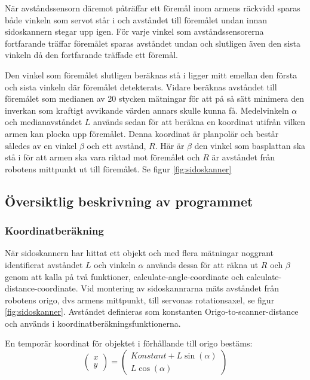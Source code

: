 När avståndssensorn däremot påträffar ett föremål inom armens räckvidd sparas både vinkeln som servot står i och avståndet till föremålet undan innan sidoskannern stegar upp igen. För varje vinkel som avståndssensorerna fortfarande träffar föremålet sparas avståndet undan och slutligen även den sista vinkeln då den fortfarande träffade ett föremål.

Den vinkel som föremålet slutligen beräknas stå i ligger mitt emellan den första och sista vinkeln där föremålet detekterats. Vidare beräknas avståndet till föremålet som medianen av 20 stycken mätningar för att på så sätt minimera den inverkan som kraftigt avvikande värden annars skulle kunna få. Medelvinkeln $\alpha$ och medianavståndet $L$ används sedan för att beräkna en koordinat utifrån vilken armen kan plocka upp föremålet. Denna koordinat är planpolär och består således av en vinkel $\beta$ och ett avstånd, $R$. Här är $\beta$ den vinkel som basplattan ska stå i för att armen ska vara riktad mot föremålet och $R$ är avståndet från robotens mittpunkt ut till föremålet. Se figur \ref{fig:sidoskanner}

\subsection{Översiktlig beskrivning av programmet}

\subsubsection{Koordinatberäkning}
När sidoskannern har hittat ett objekt och med flera mätningar noggrant identifierat avståndet $L$ och vinkeln $\alpha$ används dessa för att räkna ut $R$ och $\beta$ genom att kalla på två funktioner, calculate-angle-coordinate och calculate-distance-coordinate.
Vid montering av sidoskannrarna mäts avståndet från robotens origo, dvs armens mittpunkt, till servonas rotationsaxel, se figur \ref{fig:sidoskanner}. Avståndet definieras som konstanten Origo-to-scanner-distance och används i koordinatberäkningsfunktionerna.

En temporär koordinat för objektet i förhållande till origo bestäms:
$$\begin{pmatrix}
x \\ y
\end{pmatrix}
 = 
\begin{pmatrix}
Konstant+L \sin(\alpha) \\ 
L \cos(\alpha)
\end{pmatrix}$$

